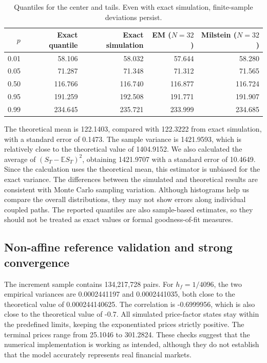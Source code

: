 \begin{table}[H]\centering\small
\caption{Quantiles for the center and tails. Even with exact simulation, finite-sample deviations persist.}\label{tab:quant}
\begin{tabular}{rrrrr}\toprule
$p$ & Exact quantile & Exact simulation & EM ($N=32$) & Milstein ($N=32$)\\\midrule
0.01 & 58.106 & 58.032 & 57.644 & 58.280\\
0.05 & 71.287 & 71.348 & 71.312 & 71.565\\
0.50 & 116.766 & 116.740 & 116.877 & 116.724\\
0.95 & 191.259 & 192.508 & 191.771 & 191.907\\
0.99 & 234.645 & 235.721 & 233.999 & 234.685\\
\bottomrule\end{tabular}\end{table}
The theoretical mean is 122.1403, compared with 122.3222 from exact simulation, with a standard error of 0.1473. The sample variance is 1421.9593, which is relatively close to the theoretical value of 1404.9152. We also calculated the average of $(S_T-\mathbb{E}S_T)^2$, obtaining 1421.9707 with a standard error of 10.4649. Since the calculation uses the theoretical mean, this estimator is unbiased for the exact variance. The differences between the simulated and theoretical results are consistent with Monte Carlo sampling variation. Although histograms help us compare the overall distributions, they may not show errors along individual coupled paths. The reported quantiles are also sample-based estimates, so they should not be treated as exact values or formal goodness-of-fit measures.

\subsection{Non-affine reference validation and strong convergence}
The increment sample contains 134,217,728 pairs. For $h_f=1/4096$, the two empirical variances are 0.0002441197 and 0.0002441035, both close to the theoretical value of 0.000244140625. The correlation is -0.6999956, which is also close to the theoretical value of -0.7. All simulated price-factor states stay within the predefined limits, keeping the exponentiated prices strictly positive. The terminal prices range from 25.1046 to 301.2824. These checks suggest that the numerical implementation is working as intended, although they do not establish that the model accurately represents real financial markets.

